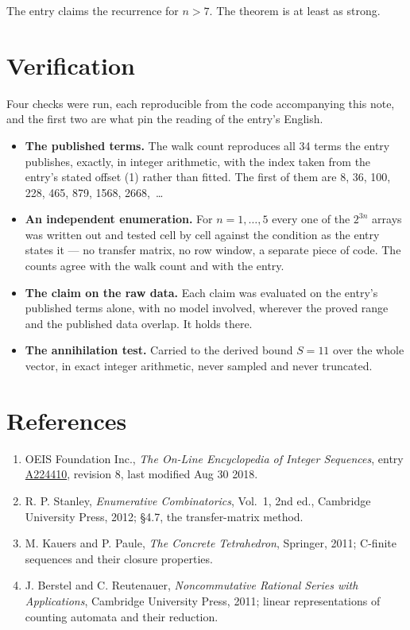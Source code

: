 \documentclass[11pt]{article}
\theoremstyle{definition}
\begin{document}
The entry claims the recurrence for $n > 7$. The theorem is at least as strong.

\section{Verification}

Four checks were run, each reproducible from the code accompanying this note, and the first two are what pin the reading of the entry's English.

\begin{itemize}

\item {\bfseries The published terms.} The walk count reproduces all 34 terms the entry publishes, exactly, in integer arithmetic, with the index taken from the entry's stated offset (1) rather than fitted. The first of them are 8, 36, 100, 228, 465, 879, 1568, 2668,~\dots

\item {\bfseries An independent enumeration.} For $n = 1,\dots,5$ every one of the $2^{3n}$ arrays was written out and tested cell by cell against the condition as the entry states it --- no transfer matrix, no row window, a separate piece of code. The counts agree with the walk count and with the entry.

\item {\bfseries The claim on the raw data.} Each claim was evaluated on the entry's published terms alone, with no model involved, wherever the proved range and the published data overlap. It holds there.

\item {\bfseries The annihilation test.} Carried to the derived bound $S = 11$ over the whole vector, in exact integer arithmetic, never sampled and never truncated.

\end{itemize}

\section{References}

\begin{enumerate}

\item OEIS Foundation Inc., \emph{The On-Line Encyclopedia of Integer Sequences}, entry \href{https://oeis.org/A224410}{A224410}, revision 8, last modified Aug 30 2018.

\item R. P. Stanley, \emph{Enumerative Combinatorics}, Vol.~1, 2nd ed., Cambridge University Press, 2012; \S4.7, the transfer-matrix method.

\item M. Kauers and P. Paule, \emph{The Concrete Tetrahedron}, Springer, 2011; C-finite sequences and their closure properties.

\item J. Berstel and C. Reutenauer, \emph{Noncommutative Rational Series with Applications}, Cambridge University Press, 2011; linear representations of counting automata and their reduction.

\end{enumerate}
\end{document}
